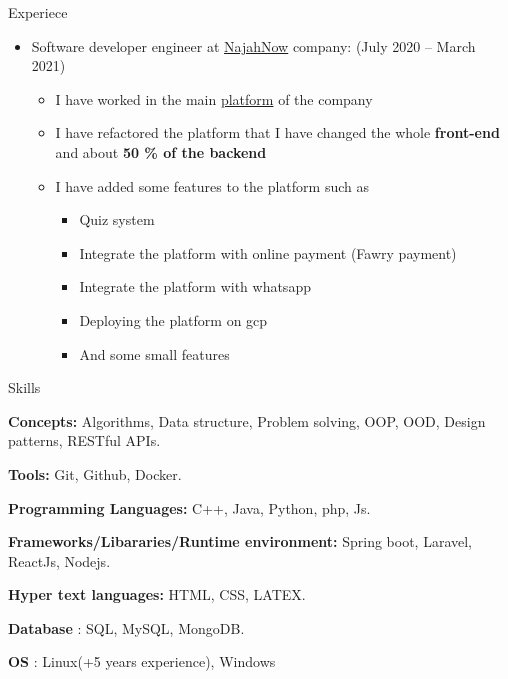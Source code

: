 \documentclass{resume}
\begin{document}
\begin{rSection}{Experiece}
\begin{itemize}
    \item Software developer engineer at \href{https://najahnow.net}{NajahNow} company: \hfill{(July 2020 – March 2021)}
          \begin{itemize}
              \item I have worked in the main \href{https://najahnow.net}{platform} of the company
              \item I have refactored the platform that I have changed the whole \textbf{front-end} and about \textbf{50 \% of the backend}
              \item I have added some features to the platform such as 
              \begin{itemize}
                  \item Quiz system 
                  \item Integrate the platform with online payment (Fawry payment)
                  \item Integrate the platform with whatsapp 
                  \item Deploying the platform on gcp
                  \item And some small features
              \end{itemize}
          \end{itemize}
  \end{itemize}
\end{rSection}


\newpage

\begin{rSection}{Skills}
  \item \textbf{Concepts:} Algorithms, Data structure, Problem solving, OOP, OOD, Design patterns, RESTful APIs.
  \item \textbf{Tools:} Git, Github, Docker.
  \item \textbf{Programming Languages:} C++, Java, Python, php, Js.
  \item \textbf{Frameworks/Libararies/Runtime environment:} Spring boot, Laravel, ReactJs, Nodejs.
  \item \textbf{Hyper text languages:} HTML, CSS, LATEX.
  \item \textbf{Database}  : SQL, MySQL, MongoDB.
  \item \textbf{OS} : Linux(+5 years experience), Windows
\end{rSection}
\end{document}
